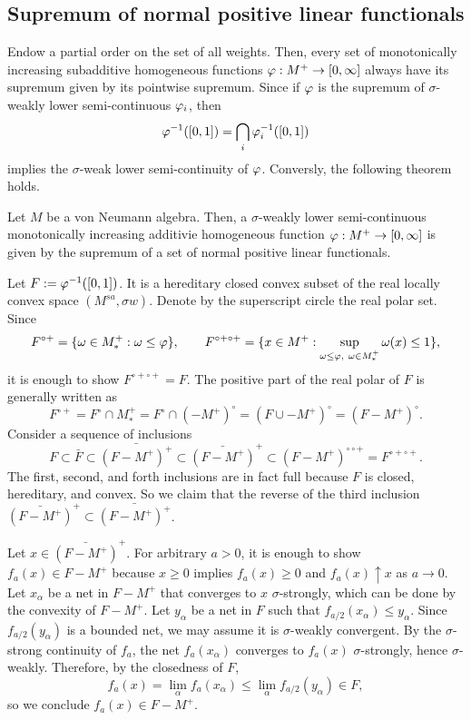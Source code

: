 \documentclass{../../small}
\begin{document}
\subsection{Supremum of normal positive linear functionals}

Endow a partial order on the set of all weights.
Then, every set of monotonically increasing subadditive homogeneous functions $\varphi:M^+\to[0,\infty]$ always have its supremum given by its pointwise supremum.
Since if $\varphi$ is the supremum of $\sigma$-weakly lower semi-continuous $\varphi_i$, then
\[\varphi^{-1}([0,1])=\bigcap_i\varphi_i^{-1}([0,1])\]
implies the $\sigma$-weak lower semi-continuity of $\varphi$.
Conversly, the following theorem holds.

\begin{thm}
Let $M$ be a von Neumann algebra.
Then, a $\sigma$-weakly lower semi-continuous monotonically increasing additivie homogeneous function $\varphi:M^+\to[0,\infty]$ is given by the supremum of a set of normal positive linear functionals.
\end{thm}
\begin{pf}
Let $F:=\varphi^{-1}([0,1])$.
It is a hereditary closed convex subset of the real locally convex space $(M^{sa},\sigma w)$.
Denote by the superscript circle the real polar set.
Since
\[F^{\circ+}=\{\omega\in M_*^+:\omega\le\varphi\},\qquad
F^{\circ+\circ+}=\{x\in M^+:\sup_{\omega\le\varphi,\ \omega\in M_*^+}\omega(x)\le1\},\]
it is enough to show $F^{\circ+\circ+}=F$.
The positive part of the real polar of $F$ is generally written as
\[F^{\circ+}=F^\circ\cap M_*^+=F^\circ\cap(-M^+)^\circ=(F\cup-M^+)^\circ=(F-M^+)^\circ.\]
Consider a sequence of inclusions
\[F\subset\bar F\subset\bar{(F-M^+)^+}\subset\bar{(F-M^+)}^+\subset(F-M^+)^{\circ\circ+}=F^{\circ+\circ+}.\]
The first, second, and forth inclusions are in fact full because $F$ is closed, hereditary, and convex.
So we claim that the reverse of the third inclusion $\bar{(F-M^+)}^+\subset\bar{(F-M^+)^+}$.

Let $x\in\bar{(F-M^+)}^+$.
For arbitrary $a>0$, it is enough to show $f_a(x)\in F-M^+$ because $x\ge0$ implies $f_a(x)\ge0$ and $f_a(x)\uparrow x$ as $a\to0$.
Let $x_\alpha$ be a net in $F-M^+$ that converges to $x$ $\sigma$-strongly, which can be done by the convexity of $F-M^+$.
Let $y_\alpha$ be a net in $F$ such that $f_{a/2}(x_\alpha)\le y_\alpha$.
Since $f_{a/2}(y_\alpha)$ is a bounded net, we may assume it is $\sigma$-weakly convergent.
By the $\sigma$-strong continuity of $f_a$, the net $f_a(x_\alpha)$ converges to $f_a(x)$ $\sigma$-strongly, hence $\sigma$-weakly.
Therefore, by the closedness of $F$,
\[f_a(x)=\lim_\alpha f_a(x_\alpha)\le\lim_\alpha f_{a/2}(y_\alpha)\in F,\]
so we conclude $f_a(x)\in F-M^+$.
\end{pf}
\end{document}
